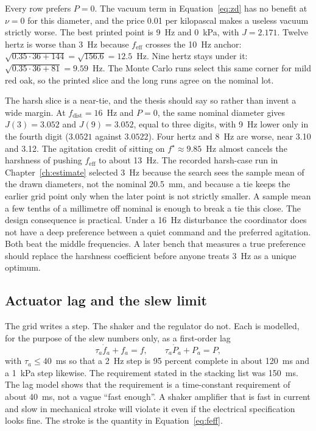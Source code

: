 Every row prefers $P=0$. The vacuum term in Equation~\eqref{eq:zd} has no benefit at $\nu=0$ for this diameter, and the price 0.01 per kilopascal makes a useless vacuum strictly worse. The best printed point is 9~Hz and 0~kPa, with $J=2.171$. Twelve hertz is worse than 3~Hz because $f_{\mathrm{eff}}$ crosses the 10~Hz anchor: $\sqrt{0.35\cdot 36+144}=\sqrt{156.6}=12.5$~Hz. Nine hertz stays under it: $\sqrt{0.35\cdot 36+81}=9.59$~Hz. The Monte Carlo runs select this same corner for mild red oak, so the printed slice and the long runs agree on the nominal lot.

The harsh slice is a near-tie, and the thesis should say so rather than invent a wide margin. At $f_{\mathrm{dist}}=16$~Hz and $P=0$, the same nominal diameter gives $J(3)=3.052$ and $J(9)=3.052$, equal to three digits, with 9~Hz lower only in the fourth digit ($3.0521$ against $3.0522$). Four hertz and 8~Hz are worse, near 3.10 and 3.12. The agitation credit of sitting on $f^{\star}\approx 9.85$~Hz almost cancels the harshness of pushing $f_{\mathrm{eff}}$ to about 13~Hz. The recorded harsh-case run in Chapter~\ref{ch:estimate} selected 3~Hz because the search sees the sample mean of the drawn diameters, not the nominal 20.5~mm, and because a tie keeps the earlier grid point only when the later point is not strictly smaller. A sample mean a few tenths of a millimetre off nominal is enough to break a tie this close. The design consequence is practical. Under a 16~Hz disturbance the coordinator does not have a deep preference between a quiet command and the preferred agitation. Both beat the middle frequencies. A later bench that measures a true preference should replace the harshness coefficient before anyone treats 3~Hz as a unique optimum.

\subsection{Actuator lag and the slew limit}

The grid writes a step. The shaker and the regulator do not. Each is modelled, for the purpose of the slew numbers only, as a first-order lag
\begin{equation}
\tau_a \dot f_a + f_a = f, \qquad \tau_a \dot P_a + P_a = P,
\label{eq:lag}
\end{equation}
with $\tau_a\le 40$~ms so that a 2~Hz step is 95 percent complete in about 120~ms and a 1~kPa step likewise. The requirement stated in the stacking list was 150~ms. The lag model shows that the requirement is a time-constant requirement of about 40~ms, not a vague ``fast enough''. A shaker amplifier that is fast in current and slow in mechanical stroke will violate it even if the electrical specification looks fine. The stroke is the quantity in Equation~\eqref{eq:feff}.

